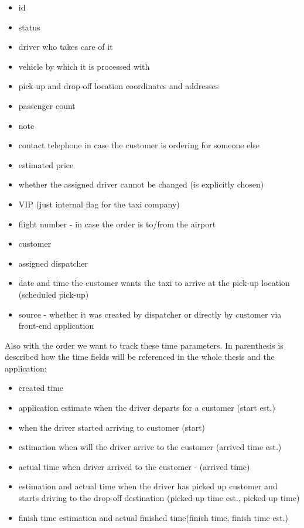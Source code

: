 		\begin{itemize}
			\item id
			\item status 
			\item driver who takes care of it
			\item vehicle by which it is processed with
			\item pick-up and drop-off location coordinates and addresses
			\item passenger count
			\item note
			\item contact telephone in case the customer is ordering for someone else
			\item estimated price
			\item whether the assigned driver cannot be changed (is explicitly chosen)
			\item VIP (just internal flag for the taxi company)
			\item flight number - in case the order is to/from the airport
			\item customer
			\item assigned dispatcher
			\item date and time the customer wants the taxi to arrive at the pick-up location (scheduled pick-up)
			\item source - whether it was created by dispatcher or directly by customer via front-end application
		\end{itemize}
		Also with the order we want to track these time parameters. In parenthesis is described how the time fields will be referenced in the whole thesis and the application:
		\begin{itemize}
			\item created time
			\item application estimate when the driver departs for a customer (start est.)
			\item when the driver started arriving to customer (start)
			\item estimation when will the driver arrive to the customer (arrived time est.)
			\item actual time when driver arrived to the customer - (arrived time)
			\item estimation and actual time when the driver has picked up  customer and starts driving to the drop-off destination (picked-up time est., picked-up time)
			\item finish time estimation and actual finished time(finish time, finish time est.)
		\end{itemize}
	

